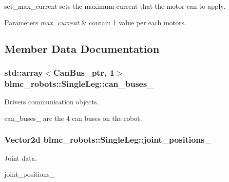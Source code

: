 set\+\_\+max\+\_\+current sets the maximum current that the motor can to apply. 


\begin{DoxyParams}{Parameters}
{\em max\+\_\+current} & contain 1 value per each motors. \\
\hline
\end{DoxyParams}


\subsection{Member Data Documentation}
\subsubsection[{\texorpdfstring{can\+\_\+buses\+\_\+}{can_buses_}}]{\setlength{\rightskip}{0pt plus 5cm}std\+::array$<${\bf Can\+Bus\+\_\+ptr}, 1$>$ blmc\+\_\+robots\+::\+Single\+Leg\+::can\+\_\+buses\+\_\+\hspace{0.3cm}{\ttfamily [private]}}\hypertarget{classblmc__robots_1_1SingleLeg_a021418412c79cfa868bfffec24155ef8}{}\label{classblmc__robots_1_1SingleLeg_a021418412c79cfa868bfffec24155ef8}


Drivers communication objects. 

can\+\_\+buses\+\_\+ are the 4 can buses on the robot. 
\subsubsection[{\texorpdfstring{joint\+\_\+positions\+\_\+}{joint_positions_}}]{\setlength{\rightskip}{0pt plus 5cm}Vector2d blmc\+\_\+robots\+::\+Single\+Leg\+::joint\+\_\+positions\+\_\+\hspace{0.3cm}{\ttfamily [private]}}\hypertarget{classblmc__robots_1_1SingleLeg_ad74d44ab47c78a46c2ba6a7aa9e71750}{}\label{classblmc__robots_1_1SingleLeg_ad74d44ab47c78a46c2ba6a7aa9e71750}


Joint data. 

joint\+\_\+positions\+\_\+ 
